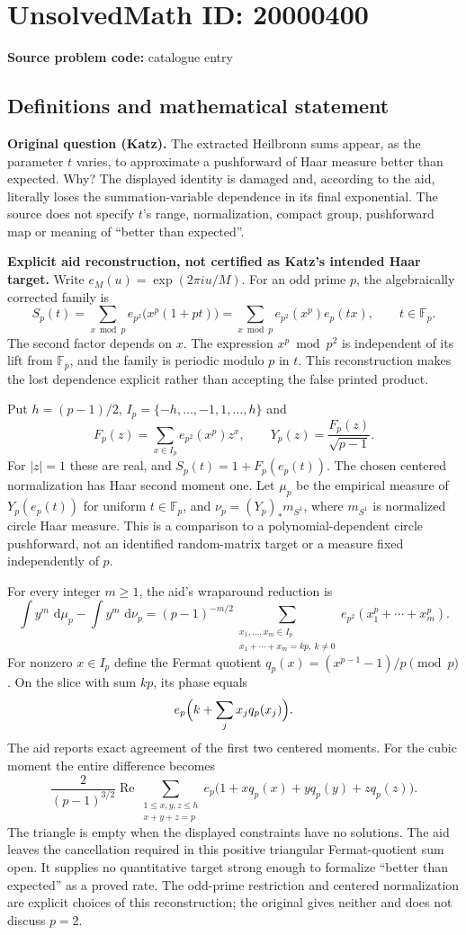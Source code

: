 \documentclass[11pt]{article}
\newcommand{\F}{\mathbb{F}}
\newcommand{\dd}{\,\mathrm{d}}
\begin{document}
\section*{UnsolvedMath ID: 20000400}
\textbf{Source problem code:} catalogue entry
\subsection{Definitions and mathematical statement}
\textbf{Original question (Katz).} The extracted Heilbronn sums appear, as the parameter $t$ varies, to approximate a pushforward of Haar measure better than expected. Why? The displayed identity is damaged and, according to the aid, literally loses the summation-variable dependence in its final exponential. The source does not specify $t$'s range, normalization, compact group, pushforward map or meaning of ``better than expected''.

\textbf{Explicit aid reconstruction, not certified as Katz's intended Haar target.} Write $e_M(u)=\exp(2\pi i u/M)$. For an odd prime $p$, the algebraically corrected family is
\[S_p(t)=\sum_{x\bmod p}e_{p^2}\bigl(x^p(1+pt)\bigr)=\sum_{x\bmod p}e_{p^2}(x^p)e_p(tx),\qquad t\in\F_p.\]
The second factor depends on $x$. The expression $x^p\bmod p^2$ is independent of its lift from $\F_p$, and the family is periodic modulo $p$ in $t$. This reconstruction makes the lost dependence explicit rather than accepting the false printed product.

Put $h=(p-1)/2$, $I_p=\{-h,\ldots,-1,1,\ldots,h\}$ and
\[F_p(z)=\sum_{x\in I_p}e_{p^2}(x^p)z^x,\qquad Y_p(z)=\frac{F_p(z)}{\sqrt{p-1}}.\]
For $|z|=1$ these are real, and $S_p(t)=1+F_p(e_p(t))$. The chosen centered normalization has Haar second moment one. Let $\mu_p$ be the empirical measure of $Y_p(e_p(t))$ for uniform $t\in\F_p$, and $\nu_p=(Y_p)_*m_{S^1}$, where $m_{S^1}$ is normalized circle Haar measure. This is a comparison to a polynomial-dependent circle pushforward, not an identified random-matrix target or a measure fixed independently of $p$.

For every integer $m\ge1$, the aid's wraparound reduction is
\[\int y^m\,\dd\mu_p-\int y^m\,\dd\nu_p=(p-1)^{-m/2}\sum_{\substack{x_1,\ldots,x_m\in I_p\\x_1+\cdots+x_m=kp,\ k\ne0}}e_{p^2}(x_1^p+\cdots+x_m^p).\]
For nonzero $x\in I_p$ define the Fermat quotient $q_p(x)=(x^{p-1}-1)/p\pmod p$. On the slice with sum $kp$, its phase equals
\[e_p\Bigl(k+\sum_jx_jq_p(x_j)\Bigr).\]
The aid reports exact agreement of the first two centered moments. For the cubic moment the entire difference becomes
\[\frac{2}{(p-1)^{3/2}}\operatorname{Re}\sum_{\substack{1\le x,y,z\le h\\x+y+z=p}}e_p\bigl(1+xq_p(x)+yq_p(y)+zq_p(z)\bigr).\]
The triangle is empty when the displayed constraints have no solutions. The aid leaves the cancellation required in this positive triangular Fermat-quotient sum open. It supplies no quantitative target strong enough to formalize ``better than expected'' as a proved rate. The odd-prime restriction and centered normalization are explicit choices of this reconstruction; the original gives neither and does not discuss $p=2$.
\end{document}
